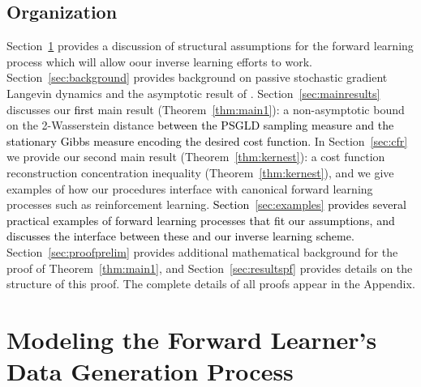 \documentclass[journal,onecolumn]{IEEEtran}
\begin{document}
\subsection{Organization}
Section~\ref{sec:fwdlrn} provides a discussion of structural assumptions for the forward learning process which will allow oour inverse learning efforts to work. Section~\ref{sec:background} provides background on passive stochastic gradient Langevin dynamics and the asymptotic result of \cite{krishnamurthy2021langevin}.  Section~\ref{sec:mainresults} discusses our \textcolor{black}{first} main result (Theorem~\ref{thm:main1}): a non-asymptotic bound on the 2-Wasserstein distance \textcolor{black}{between the PSGLD sampling measure and the stationary Gibbs measure encoding the desired cost function.} {\color{black}In Section~\ref{sec:cfr} we provide our second main result (Theorem~\ref{thm:kernest}):} a cost function reconstruction concentration inequality (Theorem~\ref{thm:kernest}), and we give examples of how our procedures interface with canonical forward learning processes such as reinforcement learning. 
\textcolor{black}{Section~\ref{sec:examples} provides several practical examples of forward learning processes that fit our assumptions, and discusses the interface between these and our inverse learning scheme.} Section~\ref{sec:proofprelim} provides additional mathematical background for the proof of Theorem~\ref{thm:main1}, and Section~\ref{sec:resultspf} provides details on the structure of this proof. The complete details of all proofs appear in the Appendix. %


\section{Modeling the Forward Learner's Data Generation Process}
\label{sec:fwdlrn}
\end{document}

